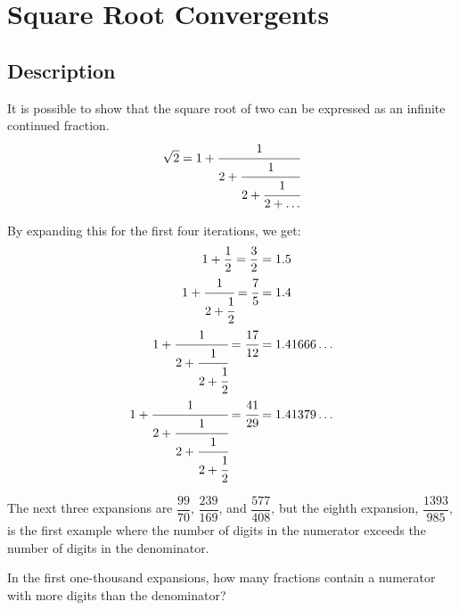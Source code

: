 \section{Square Root Convergents}
\subsection{Description}

It is possible to show that the square root of two can be expressed as an infinite continued fraction.
\begin{equation*}
	\sqrt{2} = 1 + \cfrac{1}{2 + \cfrac{1}{2 + \cfrac{1}{2 + \dots}}}
\end{equation*}

By expanding this for the first four iterations, we get:
\begin{align*}
	1 + \dfrac{1}{2} = \dfrac{3}{2}                                                & = 1.5          \\
	1 + \cfrac{1}{2 + \cfrac{1}{2}} = \cfrac{7}{5}                                 & = 1.4          \\
	1 + \cfrac{1}{2 + \cfrac{1}{2 + \cfrac{1}{2}}} = \cfrac{17}{12}                & = 1.41666\dots \\
	1 + \cfrac{1}{2 + \cfrac{1}{2 + \cfrac{1}{2 + \cfrac{1}{2}}}} = \cfrac{41}{29} & = 1.41379\dots \\
\end{align*}

The next three expansions are \( \dfrac{99}{70} \), \( \dfrac{239}{169} \), and \( \dfrac{577}{408} \), but the eighth expansion,
\( \dfrac{1393}{985} \), is the first example where the number of digits in the numerator exceeds the number of digits in the
denominator.

In the first one-thousand expansions, how many fractions contain a numerator with more digits than the denominator?
